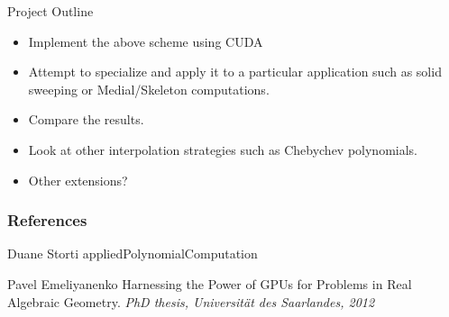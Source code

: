 \documentclass{beamer}
\begin{document}
	

	\begin{frame}
		\begin{center}
			\huge Project Outline
		\end{center}
		
		\begin{itemize}
			\item Implement the above scheme using CUDA
			\item Attempt to specialize and apply it to a particular application such as solid sweeping or Medial/Skeleton computations.
			\item Compare the results.
			\item Look at other interpolation strategies such as Chebychev polynomials. 
			\item Other extensions?
			
		\end{itemize}
		
	\end{frame}
	
	
	
	
	
	\begin{frame}
		\frametitle{References}
		\footnotesize{
			\begin{thebibliography}{99} %
				 Duane Storti 
				\newblock appliedPolynomialComputation
				
				 Pavel Emeliyanenko
				\newblock Harnessing the Power of GPUs for Problems in Real Algebraic Geometry.
				\newblock \emph{PhD thesis, Universität des Saarlandes, 2012} 
			\end{thebibliography}
		}
	\end{frame}
	
\end{document}

